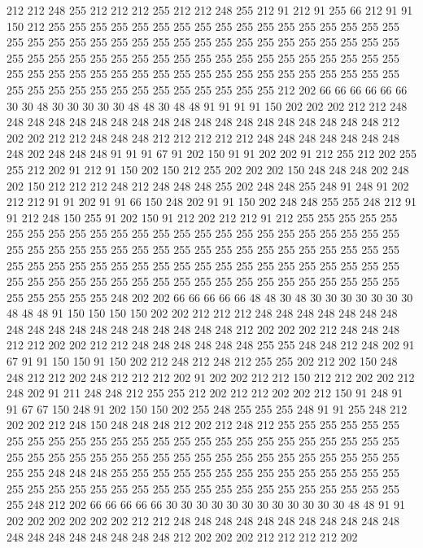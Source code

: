 212 212 248 255 212 212 212 255 212 212 248 255 212 91 212 91 255 66 212 91
91 150 212 255 255 255 255 255 255 255 255 255 255 255 255 255 255 255 255 255
255 255 255 255 255 255 255 255 255 255 255 255 255 255 255 255 255 255 255 255
255 255 255 255 255 255 255 255 255 255 255 255 255 255 255 255 255 255 255 255
255 255 255 255 255 255 255 255 255 255 255 255 255 255 255 255 255 255 255 255
255 255 255 255 255 255 255 255 255 255 212 202 66 66 66 66 66 66 30 30
48 30 30 30 30 30 48 48 30 48 48 91 91 91 91 150 202 202 202 212
212 248 248 248 248 248 248 248 248 248 248 248 248 248 248 248 248 248 248 248
212 202 202 212 212 248 248 248 212 212 212 212 212 248 248 248 248 248 248 248
248 202 248 248 248 91 91 91 67 91 202 150 91 91 202 202 91 212 255 212
202 255 255 212 202 91 212 91 150 202 150 212 255 202 202 202 150 248 248 248
202 248 202 150 212 212 212 248 212 248 248 248 255 202 248 248 255 248 91 248
91 202 212 212 91 91 202 91 91 66 150 248 202 91 91 150 202 248 248 255
255 248 212 91 91 212 248 150 255 91 202 150 91 212 202 212 212 91 212 255
255 255 255 255 255 255 255 255 255 255 255 255 255 255 255 255 255 255 255 255
255 255 255 255 255 255 255 255 255 255 255 255 255 255 255 255 255 255 255 255
255 255 255 255 255 255 255 255 255 255 255 255 255 255 255 255 255 255 255 255
255 255 255 255 255 255 255 255 255 255 255 255 255 255 255 255 255 255 255 255
255 255 255 255 255 248 202 202 66 66 66 66 66 48 48 30 48 30 30 30
30 30 30 30 48 48 48 91 150 150 150 150 202 202 212 212 212 248 248 248
248 248 248 248 248 248 248 248 248 248 248 248 248 248 248 212 202 202 202 212
248 248 248 212 212 202 202 212 212 248 248 248 248 248 248 255 255 248 248 212
248 202 91 67 91 91 150 150 91 150 202 212 248 212 248 212 255 255 202 212
202 150 248 248 212 212 202 248 212 212 212 202 91 202 202 212 212 150 212 212
202 202 212 248 202 91 211 248 248 212 255 255 212 202 212 212 202 202 212 150
91 248 91 91 67 67 150 248 91 202 150 150 202 255 248 255 255 255 248 91
91 255 248 212 202 202 212 248 150 248 248 248 212 202 212 248 212 255 255 255
255 255 255 255 255 255 255 255 255 255 255 255 255 255 255 255 255 255 255 255
255 255 255 255 255 255 255 255 255 255 255 255 255 255 255 255 255 255 255 255
255 255 255 248 248 248 255 255 255 255 255 255 255 255 255 255 255 255 255 255
255 255 255 255 255 255 255 255 255 255 255 255 255 255 255 255 255 255 255 255
248 212 202 66 66 66 66 66 30 30 30 30 30 30 30 30 30 30 30 30
48 48 91 91 202 202 202 202 202 202 212 212 248 248 248 248 248 248 248 248
248 248 248 248 248 248 248 248 248 248 248 212 202 202 202 212 212 212 212 202
